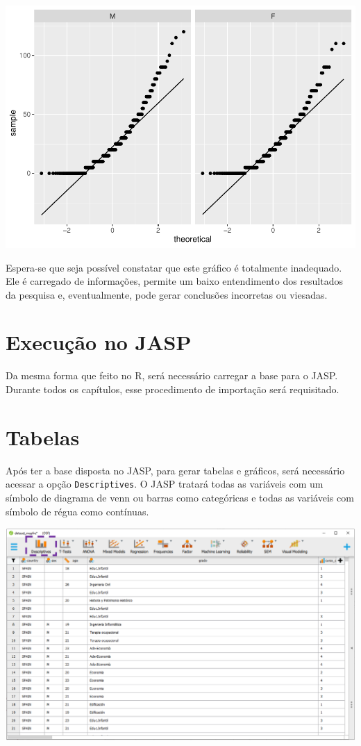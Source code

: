 \documentclass[
]{book}
\begin{document}
\begin{center}\includegraphics{gitbook-demo_files/figure-latex/unnamed-chunk-33-1} \end{center}

Espera-se que seja possível constatar que este gráfico é totalmente
inadequado. Ele é carregado de informações, permite um baixo
entendimento dos resultados da pesquisa e, eventualmente, pode gerar
conclusões incorretas ou viesadas.

\hypertarget{execuuxe7uxe3o-no-jasp}{%
\section{Execução no JASP}\label{execuuxe7uxe3o-no-jasp}}

Da mesma forma que feito no R, será necessário carregar a base para o
JASP. Durante todos os capítulos, esse procedimento de importação será
requisitado.

\hypertarget{tabelas-1}{%
\section{Tabelas}\label{tabelas-1}}

Após ter a base disposta no JASP, para gerar tabelas e gráficos, será
necessário acessar a opção \texttt{Descriptives}. O JASP tratará todas
as variáveis com um símbolo de diagrama de venn ou barras como
categóricas e todas as variáveis com símbolo de régua como contínuas.

\includegraphics{./img/cap_desc_jasp_descritivo.png}
\end{document}
